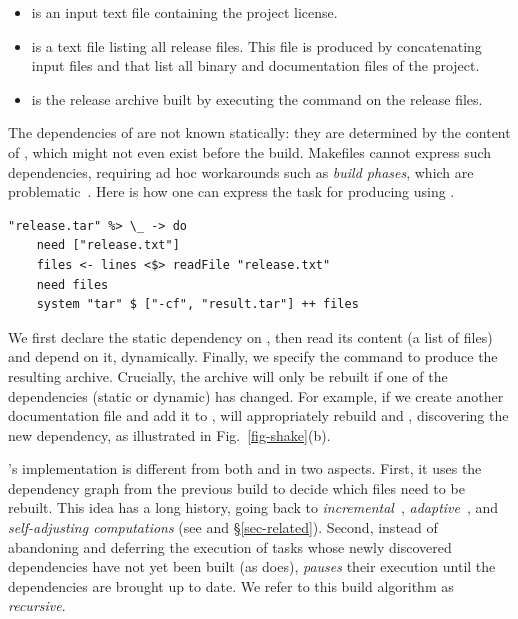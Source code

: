\begin{itemize}
    \item {} is an input text file containing the project license.
    \item {} is a text file listing all release files. This file
    is produced by concatenating input files  and 
    that list all binary and documentation files of the project.
    \item {} is the release archive built by executing the
    command  on the release files.
\end{itemize}

The dependencies of  are not known statically: they are
determined by the content of , which might not even exist
before the build. Makefiles cannot express such dependencies, requiring ad hoc
workarounds such as \emph{build phases}, which are problematic~\cite{hadrian}.
Here is how one can express the task for producing  using \Shake.

\vspace{1mm}
\begin{verbatim}
"release.tar" %> \_ -> do
    need ["release.txt"]
    files <- lines <$> readFile "release.txt"
    need files
    system "tar" $ ["-cf", "result.tar"] ++ files
\end{verbatim}
\vspace{1mm}

\noindent
We first declare the static dependency on , then read its
content (a list of files) and depend on it, dynamically. Finally, we specify the
command to produce the resulting archive. Crucially, the archive will only be
rebuilt if one of the dependencies (static or dynamic) has changed. For example,
if we create another documentation file  and add it to
, \Shake will appropriately rebuild  and
, discovering the new dependency, as illustrated in
Fig.~\ref{fig-shake}(b).

\Shake's implementation is different from both \Make and \Excel in two aspects.
First, it uses the dependency graph from the previous build to decide which
files need to be rebuilt. This idea has a long history, going back to
\emph{incremental}~\cite{demers1981incremental},
\emph{adaptive}~\cite{acar2002adaptive}, and
\emph{self-adjusting computations} (see \cite{acar2007selfadjusting} and \S\ref{sec-related}).
Second, instead of abandoning
and deferring the execution of tasks whose newly discovered dependencies have
not yet been built (as \Excel does), \Shake \emph{pauses} their execution until
the dependencies are brought up to date. We refer to this build algorithm as
\emph{recursive}.

